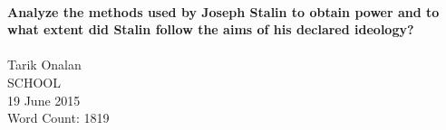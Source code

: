 \begin{titlepage}
    \vspace*{\fill}
    \begin{center}
        \HRule \\[0.4cm]
        { \large \bfseries Analyze the methods used by Joseph Stalin to obtain power and to what extent did Stalin follow the aims of his declared ideology? \\[0.4cm] }
        \HRule \\[1.5cm]

        Tarik Onalan
        \\[0.4cm]
        SCHOOL
        \\[0.4cm]
        19 June 2015
        \\[0.4cm]
        Word Count: 1819
    \end{center}
    \vspace*{\fill}
\end{titlepage}